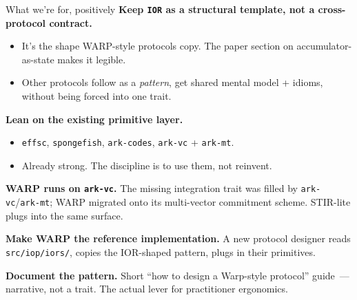 \documentclass[10pt,aspectratio=169]{beamer}
\begin{document}
\begin{frame}{What we're for, positively}
\textbf{Keep \texttt{IOR} as a structural template, not a cross-protocol contract.}
\begin{itemize}\small
  \item It's the shape WARP-style protocols copy. The paper section on accumulator-as-state makes it legible.
  \item Other protocols follow as a \emph{pattern}, get shared mental model + idioms, without being forced into one trait.
\end{itemize}

\textbf{Lean on the existing primitive layer.}
\begin{itemize}\small
  \item \texttt{effsc}, \texttt{spongefish}, \texttt{ark-codes}, \texttt{ark-vc} + \texttt{ark-mt}.
  \item Already strong. The discipline is to use them, not reinvent.
\end{itemize}

\textbf{WARP runs on \texttt{ark-vc}.} The missing integration trait was filled by \texttt{ark-vc}/\texttt{ark-mt}; WARP migrated onto its multi-vector commitment scheme. STIR-lite plugs into the same surface.

\textbf{Make WARP the reference implementation.} A new protocol designer reads \texttt{src/iop/iors/}, copies the IOR-shaped pattern, plugs in their primitives.

\textbf{Document the pattern.} Short ``how to design a Warp-style protocol'' guide \,---\, narrative, not a trait. The actual lever for practitioner ergonomics.
\end{frame}
\end{document}
